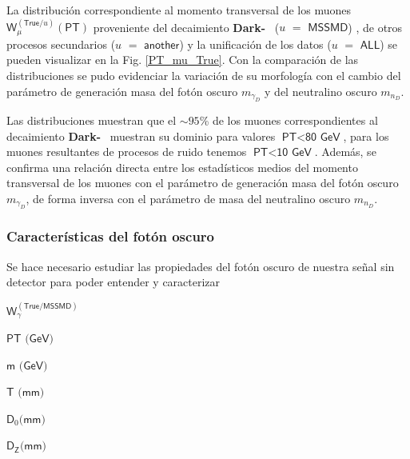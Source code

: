 La distribución correspondiente al momento transversal de los muones $\textsf{W}^{(\textsf{True}/u)}_\mu (\textsf{PT})$ proveniente del decaimiento  \textbf{Dark-}\SUSY ~ ($u$ $=$ $\textsf{MSSMD}$)%
, de otros procesos secundarios ($u$ $=$ $\textsf{another}$) %
y la unificación de los datos ($u$ $=$ $\textsf{ALL}$) %
se pueden visualizar en la Fig. \ref{PT_mu_True}. Con la comparación de las distribuciones se pudo evidenciar la variación de su morfología con el cambio del parámetro de generación masa del fotón oscuro $m_{\gamma_D}$ y del neutralino oscuro $m_{n_D}$. 


Las distribuciones muestran que el $\sim 95$\% de los muones correspondientes al decaimiento \textbf{Dark-}\SUSY ~ muestran su dominio para valores $\textsf{PT} < \textsf{80 GeV}$, para los muones resultantes de procesos de ruido tenemos $\textsf{PT} < \textsf{10 GeV}$. Además, se confirma una relación directa entre los estadísticos medios del momento transversal de los muones con el parámetro de generación masa del fotón oscuro $m_{\gamma_D}$, de forma inversa con el parámetro de masa del neutralino oscuro $m_{n_D}$.


\subsubsection{Características del fotón oscuro}
Se hace necesario estudiar las propiedades del fotón oscuro de nuestra señal sin detector para poder entender y caracterizar 

$\textsf{W}^{(\textsf{True/MSSMD})}_{\gamma}$

$\textsf{PT (GeV)}$

$\textsf{m (GeV)}$

$\textsf{T (mm)}$

$\textsf{D}_0 \textsf{(mm)}$

$\textsf{D}_\textsf{Z} \textsf{(mm)}$


